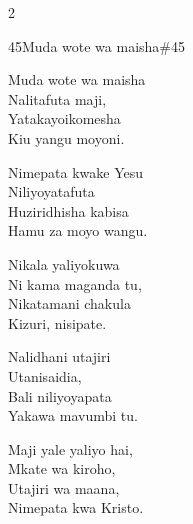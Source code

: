 \begin{multicols}{2}
\begin{hymn}{45}{Muda wote wa maisha}{\#45}
\begin{stanza}
Muda wote wa maisha\\
Nalitafuta maji,\\
Yatakayoikomesha\\
Kiu yangu moyoni.
\end{stanza}
\begin{chorus}
Nimepata kwake Yesu\\
Niliyoyatafuta\\
Huziridhisha kabisa\\
Hamu za moyo wangu.
\end{chorus}
\begin{stanza}
Nikala yaliyokuwa\\
Ni kama maganda tu,\\
Nikatamani chakula\\
Kizuri, nisipate.
\end{stanza}
\begin{stanza}
Nalidhani utajiri\\
Utanisaidia,\\
Bali niliyoyapata\\
Yakawa mavumbi tu.
\end{stanza}
\begin{stanza}
Maji yale yaliyo hai,\\
Mkate wa kiroho,\\
Utajiri wa maana,\\
Nimepata kwa Kristo.
\end{stanza}
\end{hymn}


\end{multicols}
